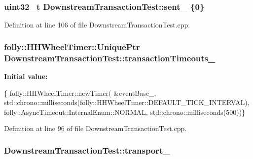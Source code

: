 \subsubsection[{sent\+\_\+}]{\setlength{\rightskip}{0pt plus 5cm}uint32\+\_\+t Downstream\+Transaction\+Test\+::sent\+\_\+ \{0\}\hspace{0.3cm}{\ttfamily [protected]}}\label{classDownstreamTransactionTest_aef38dfbd014f1c282f955e208b75cf6b}


Definition at line 106 of file Downstream\+Transaction\+Test.\+cpp.

\subsubsection[{transaction\+Timeouts\+\_\+}]{\setlength{\rightskip}{0pt plus 5cm}folly\+::\+H\+H\+Wheel\+Timer\+::\+Unique\+Ptr Downstream\+Transaction\+Test\+::transaction\+Timeouts\+\_\+\hspace{0.3cm}{\ttfamily [protected]}}\label{classDownstreamTransactionTest_a2206e5db44b6e7f1aca3b8bb27dba3f5}
{\bfseries Initial value\+:}
\begin{DoxyCode}
\{
      folly::HHWheelTimer::newTimer(
          &eventBase_,
          std::chrono::milliseconds(folly::HHWheelTimer::DEFAULT\_TICK\_INTERVAL),
          folly::AsyncTimeout::InternalEnum::NORMAL,
          std::chrono::milliseconds(500))\}
\end{DoxyCode}


Definition at line 96 of file Downstream\+Transaction\+Test.\+cpp.

\subsubsection[{transport\+\_\+}]{ Downstream\+Transaction\+Test\+::transport\+\_\+\hspace{0.3cm}{\ttfamily [protected]}}\label{classDownstreamTransactionTest_af3cd2dc4330358012a25ee2f6dc544d8}


